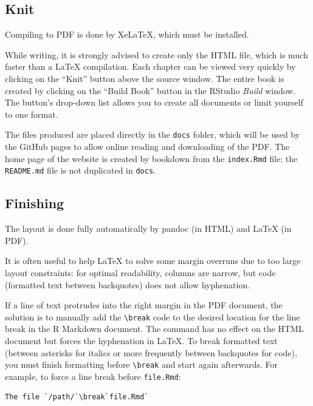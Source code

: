 \documentclass[
  12pt,
  american,
  a4paper,
  extrafontsizes,onecolumn,openright
  ]{memoir}
\begin{document}
\hypertarget{knit-1}{%
\subsection{Knit}\label{knit-1}}

Compiling to PDF is done by XeLaTeX, which must be installed.

While writing, it is strongly advised to create only the HTML file, which is much faster than a LaTeX compilation.
Each chapter can be viewed very quickly by clicking on the \enquote{Knit} button above the source window.
The entire book is created by clicking on the \enquote{Build Book} button in the RStudio \emph{Build} window.
The button's drop-down list allows you to create all documents or limit yourself to one format.

The files produced are placed directly in the \texttt{docs} folder, which will be used by the GitHub pages to allow online reading and downloading of the PDF.
The home page of the website is created by bookdown from the \texttt{index.Rmd} file: the \texttt{README.md} file is not duplicated in \texttt{docs}.

\hypertarget{finishing}{%
\subsection{Finishing}\label{finishing}}

The layout is done fully automatically by pandoc (in HTML) and LaTeX (in PDF).

It is often useful to help LaTeX to solve some margin overruns due to too large layout constraints: for optimal readability, columns are narrow, but code (formatted text between backquotes) does not allow hyphenation.

If a line of text protrudes into the right margin in the PDF document, the solution is to manually add the \texttt{\textbackslash{}break} code to the desired location for the line break in the R Markdown document.
The command has no effect on the HTML document but forces the hyphenation in LaTeX.
To break formatted text (between asterisks for italics or more frequently between backquotes for code), you must finish formatting before \texttt{\textbackslash{}break} and start again afterwards.
For example, to force a line break before \texttt{file.Rmd}:

\begin{verbatim}
The file `/path/`\break`file.Rmd`
\end{verbatim}
\end{document}
